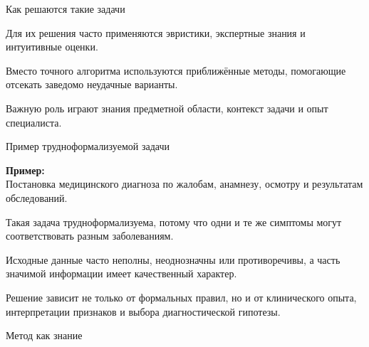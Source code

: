 \begin{frame}{Как решаются такие задачи}
	\topline
	\justifying
	
	\begin{textitemize}
		\item Для их решения часто применяются эвристики, экспертные знания и интуитивные оценки.
		\item Вместо точного алгоритма используются приближённые методы, помогающие отсекать заведомо неудачные варианты.
		\item Важную роль играют знания предметной области, контекст задачи и опыт специалиста.
	\end{textitemize}
\end{frame}

\begin{frame}{Пример трудноформализуемой задачи}
	\topline
	\justifying
	
	\vspace{10mm}
	
	\textbf{Пример:}\\ Постановка медицинского диагноза по жалобам, анамнезу, осмотру и результатам обследований.
	
	\vspace{10mm}
	
	\begin{textitemize}
		\item Такая задача трудноформализуема, потому что одни и те же симптомы могут соответствовать разным заболеваниям.
		\item Исходные данные часто неполны, неоднозначны или противоречивы, а часть значимой информации имеет качественный характер.
		\item Решение зависит не только от формальных правил, но и от клинического опыта, интерпретации признаков и выбора диагностической гипотезы.
	\end{textitemize}
\end{frame}

\begin{frame}{Метод как знание}
	\topline
	\justifying
	
	\vspace{10mm}
	
	\begin{SCn}
	\end{SCn}
\end{frame}

